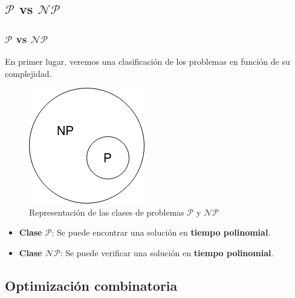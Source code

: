 \documentclass{beamer}
\begin{document}

\subsection{$\mathcal{P}$ vs $\mathcal{NP}$}

\begin{frame}
\frametitle{$\mathcal{P}$ vs $\mathcal{NP}$}

En primer lugar, veremos una clasificación de los problemas en función de su complejidad.

\begin{figure}
    \centering
    \includegraphics[scale=0.5]{pres/img/introduccion/p-np.png}
    \caption{Representación de las clases de problemas $\mathcal{P}$ y $\mathcal{NP}$}
    \label{fig:p-np}
\end{figure}

\begin{itemize}
    \item \textbf{Clase $\mathcal{P}$}: Se puede encontrar una solución en \textbf{tiempo polinomial}.
    \item \textbf{Clase $\mathcal{NP}$}: Se puede verificar una solución en \textbf{tiempo polinomial}.
\end{itemize}

\end{frame}

\subsection{Optimización combinatoria}
\end{document}

